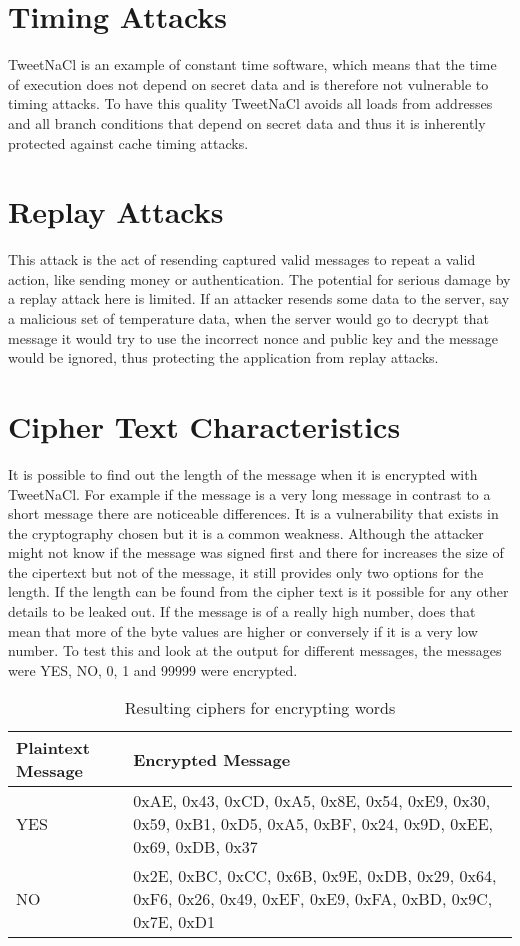 \section{Timing Attacks}

TweetNaCl is an example of constant time software, which means that the time of execution does not depend on secret data and is therefore not vulnerable to timing attacks. To have this quality TweetNaCl avoids all loads from addresses and all branch conditions that depend on secret data and thus it is inherently protected against cache timing attacks. 

\section{Replay Attacks}

This attack is the act of resending captured valid messages to repeat a valid action, like sending money or authentication. The potential for serious damage by a replay attack here is limited. If an attacker resends some data to the server, say a malicious set of temperature data, when the server would go to decrypt that message it would try to use the incorrect nonce and public key and the message would be ignored, thus protecting the application from replay attacks.

\section{Cipher Text Characteristics}

It is possible to find out the length of the message when it is encrypted with TweetNaCl. For example if the message is a very long message in contrast to a short message there are noticeable differences. It is a vulnerability that exists in the cryptography chosen but it is a common weakness. Although the attacker might not know if the message was signed first and there for increases the size of the cipertext but not of the message, it still provides only two options for the length. If the length can be found from the cipher text is it possible for any other details to be leaked out. If the message is of a really high number, does that mean that more of the byte values are higher or conversely if it is a very low number. To test this and look at the output for different messages, the messages were YES, NO, 0, 1 and 99999 were encrypted. 

\begin{table}[H]
	\centering
	\begin{tabular}{ | l | p{7cm} | }
	\hline
	Plaintext Message & Encrypted Message \\ \hline
	YES & 0xAE, 0x43, 0xCD, 0xA5, 0x8E, 0x54, 0xE9,  0x30, 0x59, 0xB1, 0xD5, 0xA5, 0xBF, 0x24, 0x9D, 0xEE, 0x69, 0xDB, 0x37  \\ \hline
	NO &  0x2E, 0xBC, 0xCC, 0x6B, 0x9E, 0xDB, 0x29, 0x64, 0xF6, 0x26, 0x49, 0xEF, 0xE9, 0xFA, 0xBD, 0x9C, 0x7E, 0xD1 \\ \hline
	\end{tabular}
	\caption{Resulting ciphers for encrypting words}
	\label{tab:yesno}
\end{table}


